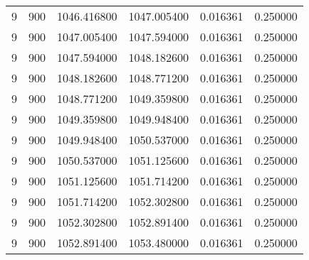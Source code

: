 \begin{longtable}{rrrrrr}
9 & 900 & 1046.416800 & 1047.005400 & 0.016361 & 0.250000 \\
9 & 900 & 1047.005400 & 1047.594000 & 0.016361 & 0.250000 \\
9 & 900 & 1047.594000 & 1048.182600 & 0.016361 & 0.250000 \\
9 & 900 & 1048.182600 & 1048.771200 & 0.016361 & 0.250000 \\
9 & 900 & 1048.771200 & 1049.359800 & 0.016361 & 0.250000 \\
9 & 900 & 1049.359800 & 1049.948400 & 0.016361 & 0.250000 \\
9 & 900 & 1049.948400 & 1050.537000 & 0.016361 & 0.250000 \\
9 & 900 & 1050.537000 & 1051.125600 & 0.016361 & 0.250000 \\
9 & 900 & 1051.125600 & 1051.714200 & 0.016361 & 0.250000 \\
9 & 900 & 1051.714200 & 1052.302800 & 0.016361 & 0.250000 \\
9 & 900 & 1052.302800 & 1052.891400 & 0.016361 & 0.250000 \\
9 & 900 & 1052.891400 & 1053.480000 & 0.016361 & 0.250000 \\
\end{longtable}
